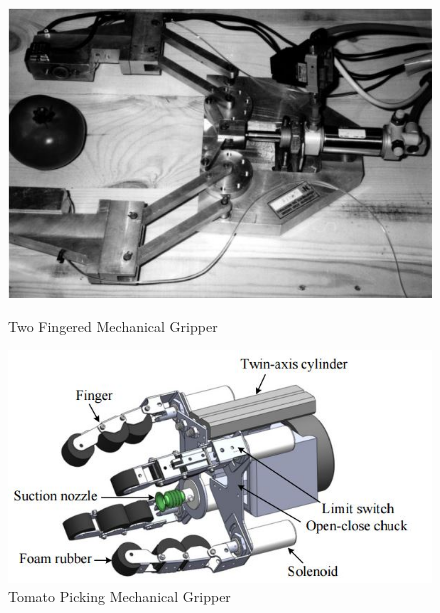 \documentclass[11pt]{article}
\begin{document}
\begin{figure}[!h]
\centering
\begin{minipage}[b]{.45\textwidth}
\includegraphics[width=0.8\linewidth]{Mechanical1}
\caption{Two Fingered Mechanical Gripper}
\label{fig:Mechanical1}
\end{minipage}
\hfill
\begin{minipage}[b]{0.5\textwidth}
\includegraphics[width=1\linewidth]{Mechanical2}
\caption{Tomato Picking Mechanical Gripper}
\label{fig:Mechanical2}
\end{minipage}
\end{figure}
\end{document}
